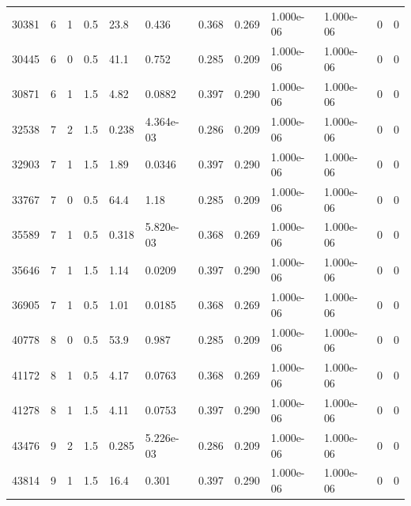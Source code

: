 \documentclass[preview]{standalone}
\begin{document}
{{\begin{tabular}{L{1.2cm}C{1.2cm} C{0.3cm}C{0.5cm} C{1.4cm}C{1.4cm} C{1.4cm}C{1.4cm} C{1.6cm}C{1.6cm} C{1.6cm}C{1.6cm}}
  30381  &     6  & 1     & 0.5 &  23.8  & 0.436  &  0.368&   0.269& 1.000e-06 & 1.000e-06   &  0 & 0  \\ 
  30445  &     6  & 0     & 0.5 &  41.1  & 0.752  &  0.285&   0.209& 1.000e-06 & 1.000e-06   &  0 & 0  \\ 
  30871  &     6  & 1     & 1.5 &  4.82  & 0.0882  &  0.397&   0.290& 1.000e-06 & 1.000e-06   &  0 & 0  \\ 
  32538  &     7  & 2     & 1.5 &  0.238  & 4.364e-03  &  0.286&   0.209& 1.000e-06 & 1.000e-06   &  0 & 0  \\ 
  32903  &     7  & 1     & 1.5 &  1.89  & 0.0346  &  0.397&   0.290& 1.000e-06 & 1.000e-06   &  0 & 0  \\ 
  33767  &     7  & 0     & 0.5 &  64.4  & 1.18  &  0.285&   0.209& 1.000e-06 & 1.000e-06   &  0 & 0  \\ 
  35589  &     7  & 1     & 0.5 &  0.318  & 5.820e-03  &  0.368&   0.269& 1.000e-06 & 1.000e-06   &  0 & 0  \\ 
  35646  &     7  & 1     & 1.5 &  1.14  & 0.0209  &  0.397&   0.290& 1.000e-06 & 1.000e-06   &  0 & 0  \\ 
  36905  &     7  & 1     & 0.5 &  1.01  & 0.0185  &  0.368&   0.269& 1.000e-06 & 1.000e-06   &  0 & 0  \\ 
  40778  &     8  & 0     & 0.5 &  53.9  & 0.987  &  0.285&   0.209& 1.000e-06 & 1.000e-06   &  0 & 0  \\ 
  41172  &     8  & 1     & 0.5 &  4.17  & 0.0763  &  0.368&   0.269& 1.000e-06 & 1.000e-06   &  0 & 0  \\ 
  41278  &     8  & 1     & 1.5 &  4.11  & 0.0753  &  0.397&   0.290& 1.000e-06 & 1.000e-06   &  0 & 0  \\ 
  43476  &     9  & 2     & 1.5 &  0.285  & 5.226e-03  &  0.286&   0.209& 1.000e-06 & 1.000e-06   &  0 & 0  \\ 
  43814  &     9  & 1     & 1.5 &  16.4  & 0.301  &  0.397&   0.290& 1.000e-06 & 1.000e-06   &  0 & 0  \\ 
\hline 
\end{tabular} 

}}
\end{document}
